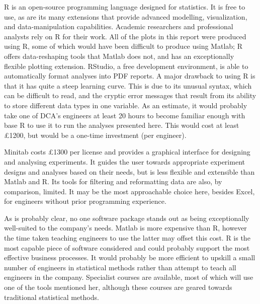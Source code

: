 \documentclass[11pt,a4paper,article]{memoir} %
\begin{document}
R is an open-source programming language designed for statistics. It is free to use, as are its many extensions that provide advanced modelling, visualization, and data-manipulation capabilities. Academic researchers and professional analysts rely on R for their work. All of the plots in this report were produced using R, some of which would have been difficult to produce using Matlab; R offers data-reshaping tools that Matlab does not, and has an exceptionally flexible plotting extension. RStudio, a free development environment, is able to automatically format analyses into PDF reports. A major drawback to using R is that it has quite a steep learning curve. This is due to its unusual syntax, which can be difficult to read, and the cryptic error messages that result from its ability to store different data types in one variable. As an estimate, it would probably take one of DCA's engineers at least 20 hours to become familiar enough with base R to use it to run the analyses presented here. This would cost at least £1200, but would be a one-time investment (per engineer). 

Minitab costs £1300 per license and provides a graphical interface for designing and analysing experiments. It guides the user towards appropriate experiment designs and analyses based on their needs, but is less flexible and extensible than Matlab and R. Its tools for filtering and reformatting data are also, by comparison, limited. It may be the most approachable choice here, besides Excel, for engineers without prior programming experience.

As is probably clear, no one software package stands out as being exceptionally well-suited to the company's needs. Matlab is more expensive than R, however the time taken teaching engineers to use the latter may offset this cost. R is the most capable piece of software considered and could probably support the most effective business processes. It would probably be more efficient to upskill a small number of engineers in statistical methods rather than attempt to teach all engineers in the company. Specialist courses are available, most of which will use one of the tools mentioned her, although these courses are geared towards traditional statistical methods.

\newpage
\end{document}

